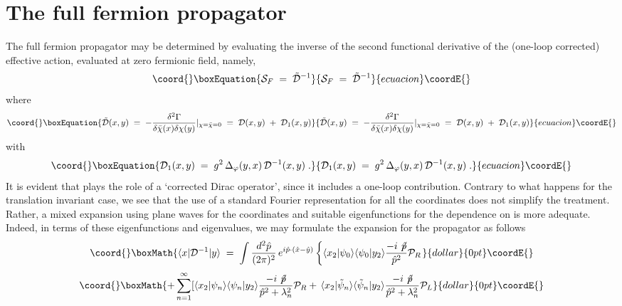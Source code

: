 \documentclass[a4paper,12pt]{article}
\begin{document}
\section{The full fermion propagator}\label{sec:ferp}
The full fermion propagator \coordHE{} may be determined by
evaluating the inverse of the second functional derivative of the
(one-loop corrected) effective action, evaluated at zero fermionic
field, namely,
\begin{equation}\coord{}\boxEquation{
  \label{eq:fullprop}
{\mathcal S}_F \;=\; {\tilde{\mathcal D}}^{-1} 
}{
  {\mathcal S}_F \;=\; {\tilde{\mathcal D}}^{-1} 
}{ecuacion}\coordE{}\end{equation}
where
\begin{equation}\coord{}\boxEquation{
  \label{eq:fer2} 
{\tilde{\mathcal D}}(x,y)\;=\;-\frac{\delta^2\Gamma}{\delta{\bar\chi}(x)
\delta\chi(y)}|_{\chi={\bar\chi} =0}
\;=\;{\mathcal D}(x,y) \;+\; {\mathcal D}_1(x,y)
}{
  {\tilde{\mathcal D}}(x,y)\;=\;-\frac{\delta^2\Gamma}{\delta{\bar\chi}(x)
\delta\chi(y)}|_{\chi={\bar\chi} =0}
\;=\;{\mathcal D}(x,y) \;+\; {\mathcal D}_1(x,y)
}{ecuacion}\coordE{}\end{equation}
with
\begin{equation}\coord{}\boxEquation{
{\mathcal D}_1(x,y)\;=\; g^2\,\Delta_\varphi (y,x)\, {\mathcal D}^{-1}(x,y) \;.         
}{
{\mathcal D}_1(x,y)\;=\; g^2\,\Delta_\varphi (y,x)\, {\mathcal D}^{-1}(x,y) \;.         
}{ecuacion}\coordE{}\end{equation}
It is evident that \coordHE{} plays the role of a
`corrected Dirac operator', since it includes a one-loop contribution.
Contrary to what happens for the translation invariant case, we see
that the use of a standard Fourier representation for all the
coordinates does not simplify the treatment. Rather, a mixed expansion
using plane waves for the \coordHE{} coordinates and suitable
eigenfunctions for the dependence on \coordHE{} is more adequate. Indeed,
in terms of these eigenfunctions and eigenvalues, we may formulate the
expansion for the propagator \coordHE{} as follows
$$\coord{}\boxMath{
\langle x|{\mathcal D}^{-1}|y\rangle\;=\; \int \frac{d^2{\hat
    p}}{(2\pi)^2} \,e^{i {\hat p}\cdot({\hat x}-{\hat y})} \left\{
  \langle x_2|\psi_0\rangle \langle\psi_0|y_2\rangle \frac{-i \not \!
    {\hat p}}{{\hat p}^2}{\mathcal P}_R \right.
}{dollar}{0pt}\coordE{}$$  $$\coord{}\boxMath{
+\sum_{n=1}^\infty [\langle
x_2|\psi_n\rangle\langle\psi_n|y_2\rangle \frac{-i \not \! {\hat
    p}}{{\hat p}^2+\lambda_n^2}{\mathcal P}_R +\,\langle x_2|{\tilde
  \psi}_n\rangle \langle{\tilde \psi}_n|y_2\rangle \frac{-i \not \!
  {\hat p}}{{\hat p}^2+\lambda_n^2} {\mathcal P}_L
}{dollar}{0pt}\coordE{}$$
\end{document}
